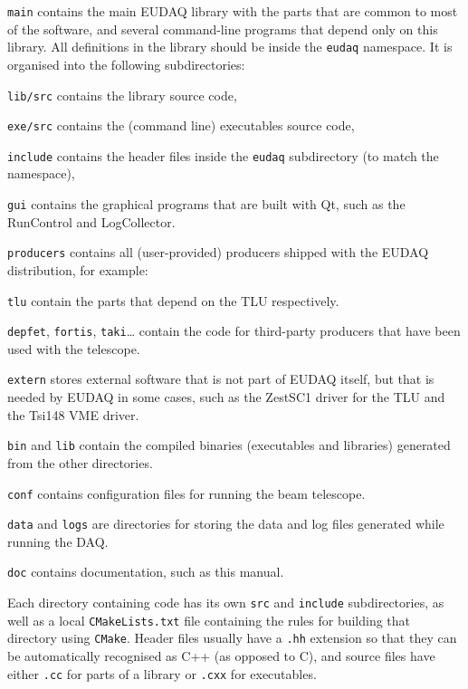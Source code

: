 \begin{myitemize}
\item \texttt{main}
  contains the main EUDAQ library with the parts that are common to most of the software,
  and several command-line programs that depend only on this library.
  All definitions in the library should be inside the \texttt{eudaq} namespace.
  It is organised into the following subdirectories:
  \begin{myitemize}
  \item \texttt{lib/src}
    contains the library source code,
  \item \texttt{exe/src}
    contains the (command line) executables source code,
  \item \texttt{include}
    contains the header files inside the \texttt{eudaq} subdirectory (to match the namespace),
  \end{myitemize}
\item \texttt{gui}
  contains the graphical programs that are built with Qt, such as the RunControl and LogCollector.
\item \texttt{producers}
  contains all (user-provided) producers shipped with the EUDAQ
  distribution, for example:
  \begin{myitemize}
\item \texttt{tlu}
  contain the parts that depend on the \gls{TLU} respectively.
\item \texttt{depfet}, \texttt{fortis}, \texttt{taki}\ldots{}
  contain the code for third-party producers that have been used with
  the telescope.
  \end{myitemize}
\item \texttt{extern}
  stores external software that is not part of EUDAQ itself, but that is needed by EUDAQ in some cases,
  such as the ZestSC1 driver for the \gls{TLU} and the Tsi148 VME driver.
\item \texttt{bin} and \texttt{lib}
  contain the compiled binaries (executables and libraries) generated from the other directories.
\item \texttt{conf}
  contains configuration files for running the beam telescope.
\item \texttt{data} and \texttt{logs}
  are directories for storing the data and log files generated while running the DAQ.
\item \texttt{doc}
  contains documentation, such as this manual.
\end{myitemize}

Each directory containing code has its own \texttt{src} and \texttt{include} subdirectories,
as well as a local \texttt{CMakeLists.txt} file containing the rules
for building that directory using \texttt{CMake}.
Header files usually have a \texttt{.hh} extension so that they can be automatically recognised as C++
(as opposed to C), and source files have either \texttt{.cc} for parts of a library or \texttt{.cxx} for executables.
